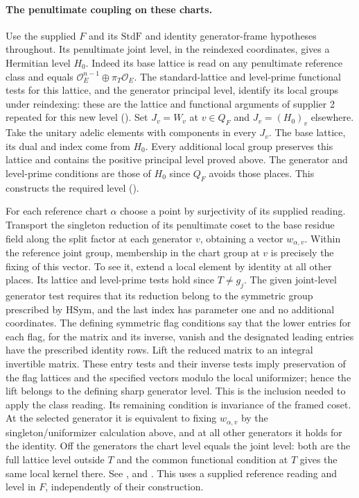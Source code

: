 \paragraph{The penultimate coupling on these charts.}
Use the supplied $F$ and its $\mathrm{StdF}$ and identity generator-frame
hypotheses throughout. Its penultimate joint level, in the reindexed
coordinates, gives a Hermitian level $H_0$. Indeed its base lattice
is read on any penultimate reference class and equals
$\mathcal O_E^{n-1}\oplus\pi_T\mathcal O_E$. The standard-lattice and
level-prime functional tests for this lattice, and the generator
principal level, identify its local groups under reindexing: these are
the lattice and functional arguments of supplier 2 repeated for this new level
(). Set $J_v=W_v$ at
$v\in Q_F$ and $J_v=(H_0)_v$ elsewhere. Take the unitary adelic
elements with components in every $J_v$. The base lattice, its dual
and index come from $H_0$. Every additional local group preserves
this lattice and contains the positive principal level proved above.
The generator and level-prime conditions are those of $H_0$ since
$Q_F$ avoids those places. This constructs the required level
().

For each reference chart $\alpha$ choose a point by surjectivity of
its supplied reading. Transport the singleton reduction of its
penultimate coset to the base residue field along the split factor
at each generator $v$, obtaining a vector $w_{\alpha,v}$. Within
the reference joint group, membership in the chart group at $v$
is precisely the fixing of this vector. To see it, extend a local
element by identity at all other places. Its lattice and level-prime
tests hold since $T\ne g_j$. The given joint-level generator test
requires that its reduction belong to the symmetric group prescribed
by $\mathrm{HSym}$, and the last index has parameter one and no
additional coordinates. The defining symmetric flag conditions say
that the lower entries for each flag, for the matrix and its inverse,
vanish and the designated leading entries have the prescribed identity
rows. Lift the reduced matrix to an integral invertible matrix.
These entry tests and their inverse tests imply preservation of the flag
lattices and the specified vectors modulo the local uniformizer;
hence the lift belongs to the defining sharp generator level.
This is the inclusion needed to apply the class reading. Its remaining
condition is invariance of the framed coset. At the selected generator
it is equivalent to fixing $w_{\alpha,v}$ by the singleton/uniformizer
calculation above, and at all other generators it holds for the identity.
Off the generators the chart level equals the joint level: both are
the full lattice level outside $T$ and the common functional condition
at $T$ gives the same local kernel there.
See ,
 and
. This uses a supplied reference
reading and level in $F$, independently of their construction.

